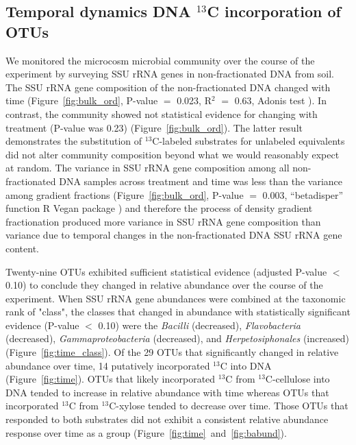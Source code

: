 \subsection{Temporal dynamics DNA $^{13}$C incorporation of OTUs}
We monitored the microcosm microbial community over the course of the
experiment by surveying SSU rRNA genes in non-fractionated DNA from soil. The
SSU rRNA gene composition of the non-fractionated DNA changed with time
(Figure~\ref{fig:bulk_ord}, P-value $=$ 0.023, R$^{2}$ $=$ 0.63, Adonis test
\citep{Anderson2001a}). In contrast, the community showed not statistical
evidence for changing with treatment (P-value was 0.23)
(Figure~\ref{fig:bulk_ord}). The latter result demonstrates the substitution of
$^{13}$C-labeled substrates for unlabeled equivalents did not alter community
composition beyond what we would reasonably expect at random. The variance in
SSU rRNA gene composition among all non-fractionated DNA samples across
treatment and time was less than the variance among gradient fractions
(Figure~\ref{fig:bulk_ord}, P-value $=$ 0.003, “betadisper” function R Vegan
package \citep{oksanen2007vegan}) and therefore the process of density gradient
fractionation produced more variance in SSU rRNA gene composition than variance
due to temporal changes in the non-fractionated DNA SSU rRNA gene content.

Twenty-nine OTUs exhibited sufficient statistical evidence (adjusted P-value
$<$ 0.10) to conclude they changed in relative abundance over the
course of the experiment. When SSU rRNA gene abundances were combined at
the taxonomic rank of "class", the classes that changed in abundance with
statistically significant evidence (P-value $<$ 0.10) were the
\textit{Bacilli} (decreased), \textit{Flavobacteria} (decreased),
\textit{Gammaproteobacteria} (decreased), and \textit{Herpetosiphonales}
(increased) (Figure~\ref{fig:time_class}). Of the 29 OTUs that
significantly changed in relative abundance over time, 14 putatively
incorporated $^{13}$C into DNA (Figure~\ref{fig:time}). OTUs that likely
incorporated $^{13}$C from $^{13}$C-cellulose into DNA tended to increase
in relative abundance with time whereas OTUs that incorporated $^{13}$C
from $^{13}$C-xylose tended to decrease over time. Those OTUs that
responded to both substrates did not exhibit a consistent relative
abundance response over time as a group
(Figure~\ref{fig:time}~and~\ref{fig:babund}).

